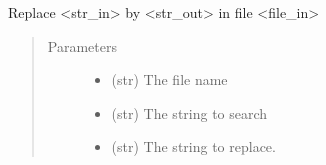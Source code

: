 \documentclass[a4paper,10pt,english]{sphinxmanual}
\begin{document}

\begin{fulllineitems}
\label{\detokenize{apidoc_src/src:src.utilsSat.replace_in_file}}
Replace \textless{}str\_in\textgreater{} by \textless{}str\_out\textgreater{} in file \textless{}file\_in\textgreater{}
\begin{quote}\begin{description}
\item[{Parameters}] \leavevmode\begin{itemize}
\item {} 
 \textendash{} (str) The file name

\item {} 
 \textendash{} (str) The string to search

\item {} 
 \textendash{} (str) The string to replace.

\end{itemize}

\end{description}\end{quote}

\end{fulllineitems}


\begin{fulllineitems}
\label{\detokenize{apidoc_src/src:src.utilsSat.reset}}
\end{fulllineitems}

\end{document}
